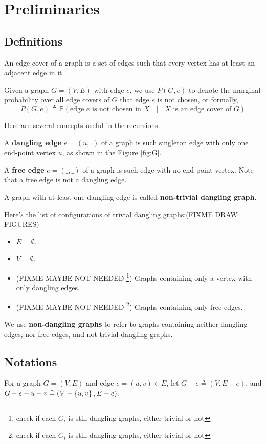 
\section{Preliminaries}
\subsection{Definitions}
An edge cover of a graph is a set of edges such that every vertex has at least an adjacent edge in it.

Given a graph $G=(V,E)$ with edge $e$,  we use $P(G, e)$ to denote the marginal probability over all edge covers of $G$ that edge $e$ is not chosen, or formally,
\begin{equation}
	P(G, e) \triangleq \mathbb{P} \left(\textrm{edge $e$ is not chosen in $X$ } \mid \textrm{ $X$ is an edge cover of $G$} \right)
	\label{defpge}
\end{equation}

Here are several concepts useful in the recursions.
\begin{Def}
	A {\bf dangling edge} $e=(u,\_)$ of a graph is such singleton edge with only one end-point vertex $u$, as shown in the Figure \ref{fig:G}.

	A {\bf free edge} $e=(\_, \_)$ of a graph is such edge with no end-point vertex. Note that a free edge is not a dangling edge.

	A graph with at least one dangling edge is called {\bf non-trivial dangling graph}.

	Here's the list of configurations of trivial dangling graphs:(FIXME DRAW FIGURES) 
	\begin{itemize}
		\item  $E=\emptyset$.
		\item $V=\emptyset$.
		\item (FIXME MAYBE NOT NEEDED \footnote{check if each $G_i$ is still dangling graphs, either trivial or not}) Graphs containing only a vertex with only dangling edges.
		\item (FIXME MAYBE NOT NEEDED \footnote{check if each $G_i$ is still dangling graphs, either trivial or not}) Graphs containing only free edges.
	\end{itemize}

	We use {\bf non-dangling graphs} to refer to graphs containing neither dangling edges, nor free edges, and not trivial dangling graphs.
\end{Def}

\subsection{Notations}
For a graph $G=(V,E)$ and edge $e=(u,v) \in E$, let $G-e \triangleq (V, E-e)$, and $G-e-u-v \triangleq (V-\left\{u,v\right\}, E-e)$.

